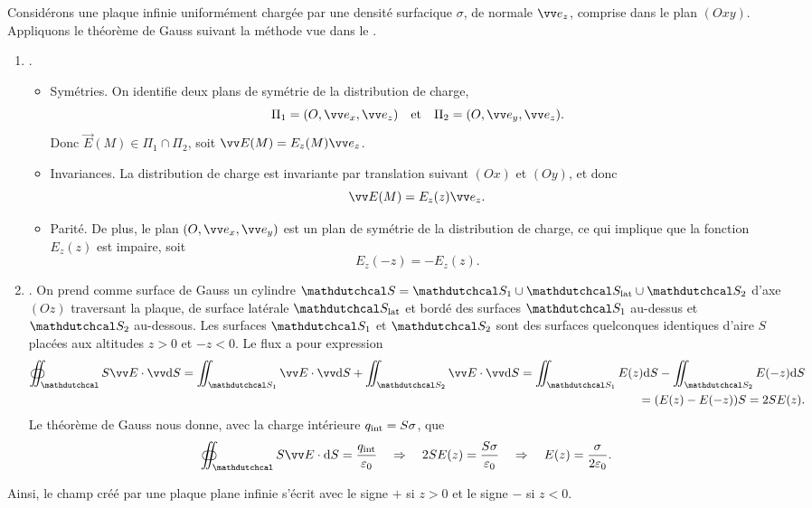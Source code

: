 \documentclass[12pt,fancy]{cours}
\begin{document}
 Considérons une plaque infinie uniformément chargée par une densité surfacique $\sigma$, de normale $\ez$, comprise dans le plan $(Oxy)$. Appliquons le théorème de Gauss suivant la méthode vue dans le .
\begin{enumerate}
  \item {}. 
  
  \begin{itemize}
    \item Symétries. On identifie deux plans de symétrie de la distribution de charge,
    $$
\Pi_1 = (O,\ex,\ez) \quad \text{et} \quad  \Pi_2 = (O,\ey,\ez).
$$
    Donc $\Vec{E}(M) \in \Pi_1 \cap \Pi_2$, soit $\E(M) = E_z(M) \ez$.
    \item Invariances.
    La distribution de charge est invariante par translation suivant $(Ox)$ et $(Oy)$, et donc
    \begin{equation}
      \E(M) = E_z(z)\ez.
    \end{equation}
    \item Parité.
    De plus, le plan $(O,\ex,\ey)$ est un plan de symétrie de la distribution de charge, ce qui implique que  la fonction $E_z(z)$ est impaire, soit
    \begin{equation}
      E_z(-z)=-E_z(z).
    \end{equation}
  \end{itemize}
  \item {}.  On prend comme surface de Gauss un cylindre $\Surf = \Surf_1 \cup \Surf_{\rm lat} \cup \Surf_2$ d’axe $(Oz)$ traversant la plaque, de surface latérale $\Surf_{\rm lat}$ et bordé des surfaces $\Surf_1$ au-dessus et $\Surf_2$ au-dessous. Les surfaces $\Surf_1$ et $\Surf_2$ sont des surfaces quelconques identiques d’aire $S$ placées aux altitudes $z>0$ et $-z<0$. Le flux a pour expression
  \begin{equation}
    \begin{split}
      \oiint_\Surf \Vec{E} \cdot \dS = \iint_{\Surf_1} \Vec{E} \cdot \dS + \iint_{\Surf_2} \Vec{E} \cdot \dS = 
      \iint_{\Surf_1} E(z) \d S - \iint_{\Surf_2} E( - z) \d S \\ = (E(z) - E(-z))S = 2S E(z).
    \end{split}
\end{equation}
Le théorème de Gauss nous donne, avec la charge intérieure $q_{\rm int} = S \sigma$, que
\begin{equation}
  \oiint_\Surf \Vec{E} \cdot \d S = \frac{q_{\rm int}}{\epz} \Rar 2 S E(z) = \frac{S \sigma}{\varepsilon_0}\quad \Rightarrow \quad E(z) = \frac{\sigma}{2\varepsilon_0}.
\end{equation}
\end{enumerate}
Ainsi, le champ créé par une plaque plane infinie s'écrit
avec le signe $+$ si $z>0$ et le signe $-$ si $z<0$.
\end{document}
